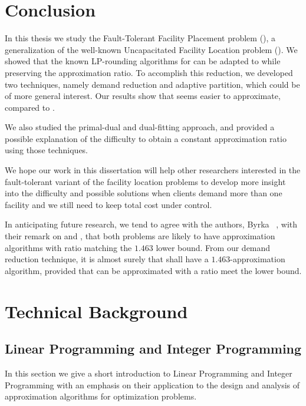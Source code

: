 \documentclass[oneside,final]{ucr}
\begin{document}
\chapter{Conclusion} \label{ch: conclusion} 

In this thesis we study the Fault-Tolerant Facility
Placement problem ({\FTFP}), a generalization of the
well-known Uncapacitated Facility Location problem
({\UFL}). We showed that the known LP-rounding algorithms
for {\UFL} can be adapted to {\FTFP} while preserving the
approximation ratio. To accomplish this reduction, we
developed two techniques, namely demand reduction and
adaptive partition, which could be of more general
interest. Our results show that {\FTFP} seems easier to
approximate, compared to {\FTFL}.

We also studied the primal-dual and dual-fitting approach,
and provided a possible explanation of the difficulty to
obtain a constant approximation ratio using those
techniques.

We hope our work in this dissertation will help other
researchers interested in the fault-tolerant variant of the
facility location problems to develop more insight into the
difficulty and possible solutions when clients demand more
than one facility and we still need to keep total cost under
control.

In anticipating future research, we tend to agree with the
authors, Byrka {\etal}~\cite{ByrkaSS10}, with their remark
on {\UFL} and {\FTFL}, that both problems are likely to have
approximation algorithms with ratio matching the $1.463$
lower bound. From our demand reduction technique, it is
almost surely that {\FTFP} shall have a
$1.463$-approximation algorithm, provided that {\FTFL} can
be approximated with a ratio meet the lower bound.




\appendix
\chapter{Technical Background}

\section{Linear Programming and Integer Programming}
\label{sec: ILP}

In this section we give a short introduction to Linear
Programming and Integer Programming with an emphasis on
their application to the design and analysis of
approximation algorithms for optimization problems.
\end{document}
